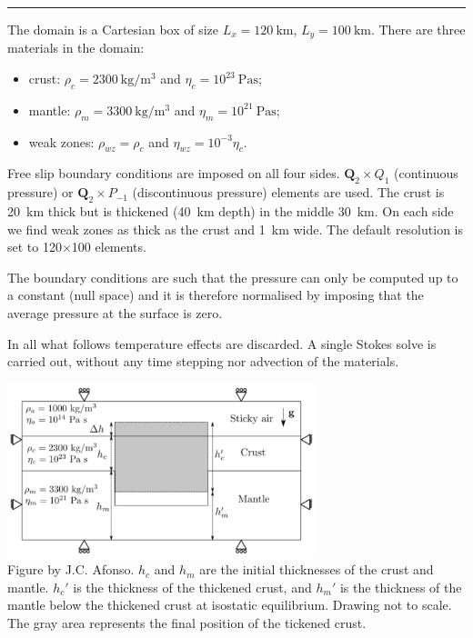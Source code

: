 \par\noindent\rule{\textwidth}{0.4pt}




The domain is a Cartesian box of size $L_x=120~\si{\km}$, $L_y=100~\si{\km}$.
There are three materials in the domain:
\begin{itemize}
\item crust: $\rho_{c}=2300~\si{\kg\per\cubic\meter}$ and $\eta_{c}=10^{23}~\si{\pascal\second}$;
\item mantle: $\rho_{m}=3300~\si{\kg\per\cubic\meter}$ and $\eta_{m}=10^{21}~\si{\pascal\second}$;
\item weak zones: $\rho_{wz}=\rho_{c}$ and $\eta_{wz}=10^{-3}\eta_{c}$.
\end{itemize}
Free slip boundary conditions are imposed on all four sides. ${\bm Q}_2 \times Q_1$ 
(continuous pressure)
or ${\bm Q}_2\times P_{-1}$ (discontinuous pressure) elements are used.
The crust is 20~\si{\km} thick but is thickened (40~\si{\km} depth) in the middle 30~\si{\km}.
On each side we find weak zones as thick as the crust and 1~\si{\km} wide. 
The default resolution is set to 120$\times$100 elements.

The boundary conditions are such that the pressure can only be computed up to a constant (null space)
and it is therefore normalised by imposing that the average pressure at the surface is zero.

In all what follows temperature effects are discarded. A single Stokes solve is carried out, without any 
time stepping nor advection of the materials.

\begin{center}
\includegraphics[width=9cm]{python_codes/fieldstone_160/images/setup}\\
{\captionfont Figure by J.C. Afonso. $h_c$ and $h_m$ are the initial thicknesses of the crust and 
mantle. $h_c'$ is the thickness of the thickened crust, and $h_m'$ is the thickness of the 
mantle below the thickened crust at isostatic equilibrium. Drawing not to scale. The gray 
area represents the final position of the tickened crust.}
\end{center}


